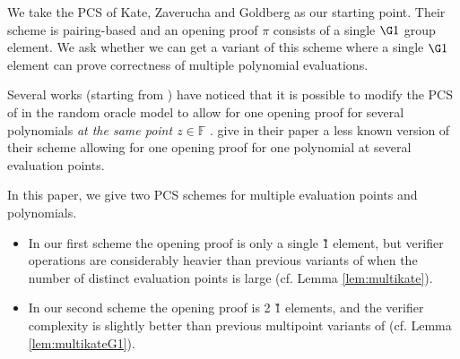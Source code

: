 \documentclass[11pt]{article} %
\newcommand{\F}{\ensuremath{\mathbb F}\xspace}
\begin{document}
We take the PCS of Kate, Zaverucha and Goldberg \cite{kate} as our starting point. Their scheme is pairing-based and an opening proof $\pi$ consists of a single $\G1$ group element. We ask whether we can get a variant of this scheme where a single $\G1$ element can prove correctness of multiple polynomial evaluations.

Several works \cite{sonic,auroralight,marlin,plonk} (starting from \cite{sonic}) have noticed that it is possible to modify the PCS of \cite{kate} in the random oracle model to allow for one opening proof for several polynomials \emph{at the same point $z\in \F$} .
\cite{kate} give in their paper a less known version of their scheme allowing for one opening proof for one polynomial at several evaluation points.



In this paper, we give two PCS schemes for multiple evaluation points and polynomials.
\begin{itemize}
 \item In our first scheme the opening proof is only a single \G1 element, but verifier operations are considerably heavier than previous variants of \cite{kate} when the number of distinct evaluation points is large (cf. Lemma \ref{lem:multikate}).
\item In our second scheme the opening proof is 2 \G1 elements, and the verifier complexity is slightly better than previous multipoint variants of \cite{kate} (cf. Lemma \ref{lem:multikateG1}).
 \end{itemize}
\end{document}

